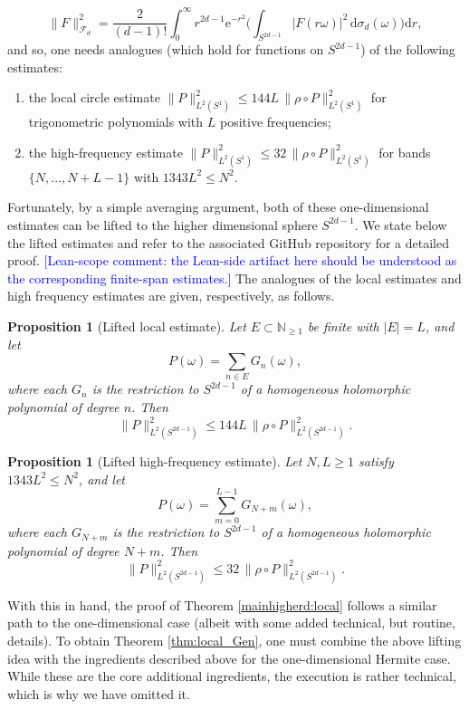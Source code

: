 \documentclass[11pt]{amsart}
\newtheorem{proposition}[theorem]{Proposition}
\theoremstyle{remark}
\newcommand{\N}{\mathbb{N}}
\newcommand{\abs}[1]{\lvert #1 \rvert}
\newcommand{\norm}[1]{\lVert #1 \rVert}
\newcommand{\dd}{\mathrm{d}}
\newcommand{\ee}{\mathrm{e}}
\newcommand{\rhoFn}{\rho}
\newcommand{\Fd}{\mathcal{F}_d}
\newcommand{\Sphere}{S^{2d-1}}
\begin{document}
\begin{equation*}\label{eq:polard}
\norm{F}_{\Fd}^2
=
\frac{2}{(d-1)!}
\int_0^\infty
r^{2d-1} \ee^{-r^2}
\biggl(
\int_{\Sphere} \abs{F(r\omega)}^2\,\dd \sigma_d(\omega)
\biggr)\dd r,
\end{equation*}
and so, one needs analogues (which hold for functions on $S^{2d-1}$) of the following estimates:
\begin{enumerate}
\item the local circle estimate
$\norm{P}_{L^2(S^1)}^2 \le 144 L\, \norm{\rhoFn \circ P}_{L^2(S^1)}^2$
for trigonometric polynomials with $L$ positive frequencies;
\item the high-frequency estimate
$\norm{P}_{L^2(S^1)}^2 \le 32\, \norm{\rhoFn \circ P}_{L^2(S^1)}^2$
for bands $\{N,\dots,N+L-1\}$ with $1343L^2 \le N^2$.
\end{enumerate}
Fortunately, by a simple averaging argument, both of these one-dimensional estimates can be lifted to the higher dimensional sphere $S^{2d-1}$. We state below the lifted estimates and refer to the associated GitHub repository for a detailed proof. \textcolor{blue}{[Lean-scope comment: the Lean-side artifact here should be understood as the corresponding finite-span estimates.] } The analogues of the local estimates and high frequency estimates are given, respectively, as follows.
\begin{proposition}[Lifted local estimate]\label{prop:lifted-local}
Let $E \subset \N_{\ge 1}$ be finite with $\abs{E} = L$, and let
\[
P(\omega) = \sum_{n \in E} G_n(\omega),
\]
where each $G_n$ is the restriction to $\Sphere$ of a homogeneous
holomorphic polynomial of degree $n$.  Then
\[
\norm{P}_{L^2(\Sphere)}^2
\le
144 L\, \norm{\rhoFn \circ P}_{L^2(\Sphere)}^2.
\]
\end{proposition}
\begin{proposition}[Lifted high-frequency estimate]\label{prop:lifted-high}
Let $N,L \ge 1$ satisfy $1343L^2 \le N^2$, and let
\[
P(\omega) = \sum_{m=0}^{L-1} G_{N+m}(\omega),
\]
where each $G_{N+m}$ is the restriction to $\Sphere$ of a homogeneous
holomorphic polynomial of degree $N+m$.  Then
\[
\norm{P}_{L^2(\Sphere)}^2
\le
32\, \norm{\rhoFn \circ P}_{L^2(\Sphere)}^2.
\]
\end{proposition}
With this in hand, the proof of Theorem \ref{mainhigherd:local} follows a similar path to the one-dimensional case (albeit with some added technical, but routine, details). To obtain Theorem \ref{thm:local_Gen}, one must combine the above lifting idea with the ingredients described above for the one-dimensional Hermite case. While these are the core additional ingredients, the execution is rather technical, which is why we have omitted it.
\end{document}
